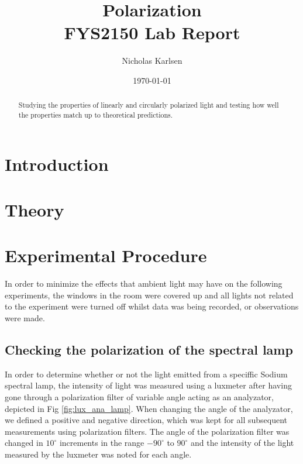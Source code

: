 \documentclass[11pt,a4paper]{article}
\begin{document}
\title{Polarization\\
\normalsize{FYS2150 Lab Report}\\}

\author{Nicholas Karlsen}

\date{\today}%

\maketitle
\begin{abstract}
  Studying the properties of linearly and circularly polarized light and testing how well the properties match up to theoretical predictions.
\end{abstract}

\twocolumn


\section{\label{sect:intro}Introduction}
  

\section{\label{sect:theory}Theory}

\section{\label{section:experimental}Experimental Procedure} 
  
  In order to minimize the effects that ambient light may have on the following experiments, the windows in the room were covered up and all lights not related to the experiment were turned off whilst data was being recorded, or observations were made.

  \subsection{\label{subsect:polar_lamp}Checking the polarization of the spectral lamp}
    In order to determine whether or not the light emitted from a speciffic Sodium spectral lamp, the intensity of light was measured using a luxmeter\cite{data:luxmeter} after having gone through a polarization filter of variable angle acting as an analyzator, depicted in Fig \ref{fig:lux_ana_lamp}. When changing the angle of the analyzator, we defined a positive and negative direction, which was kept for all subsequent measurements using polarization filters. The angle of the polarization filter was changed in $10^\circ$ increments in the range $-90^\circ$ to $90^\circ$ and the intensity of the light measured by the luxmeter was noted for each angle. 
\end{document}
